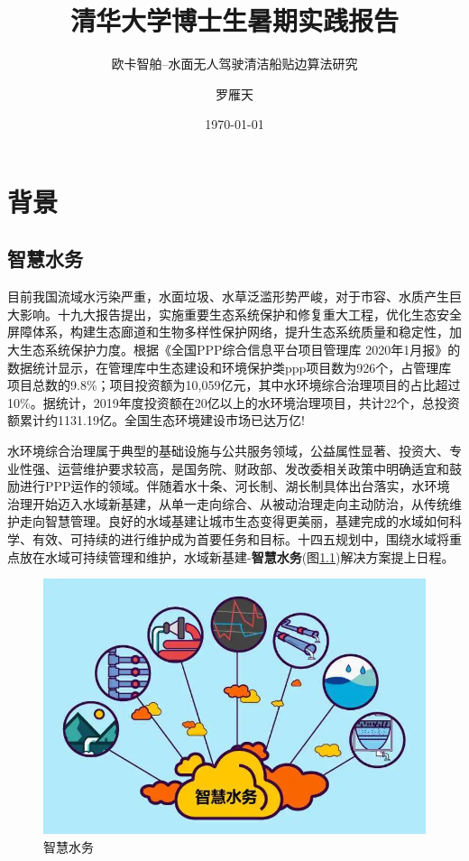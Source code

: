 \documentclass[cn,12pt,color=mine,scheme=chinese,bibstyle=gb7714-2015]{elegantbook}
\title{清华大学博士生暑期实践报告}
\subtitle{欧卡智舶--水面无人驾驶清洁船贴边算法研究}
\author{罗雁天}
\institute{清华大学电子工程系}
\date{\today}
\begin{document}
\maketitle
	
\tableofcontents

\mainmatter

\chapter{背景}
\section{智慧水务}
目前我国流域水污染严重，水面垃圾、水草泛滥形势严峻，对于市容、水质产生巨大影响。十九大报告提出，实施重要生态系统保护和修复重大工程，优化生态安全屏障体系，构建生态廊道和生物多样性保护网络，提升生态系统质量和稳定性，加大生态系统保护力度。根据《全国PPP综合信息平台项目管理库 2020年1月报》的数据统计显示，在管理库中生态建设和环境保护类ppp项目数为926个，占管理库项目总数的9.8\%；项目投资额为10,059亿元，其中水环境综合治理项目的占比超过10\%。据统计，2019年度投资额在20亿以上的水环境治理项目，共计22个，总投资额累计约1131.19亿。全国生态环境建设市场已达万亿!

水环境综合治理属于典型的基础设施与公共服务领域，公益属性显著、投资大、专业性强、运营维护要求较高，是国务院、财政部、发改委相关政策中明确适宜和鼓励进行PPP运作的领域。伴随着水十条、河长制、湖长制具体出台落实，水环境治理开始迈入水域新基建，从单一走向综合、从被动治理走向主动防治，从传统维护走向智慧管理。良好的水域基建让城市生态变得更美丽，基建完成的水域如何科学、有效、可持续的进行维护成为首要任务和目标。十四五规划中，围绕水域将重点放在水域可持续管理和维护，水域新基建-\textbf{智慧水务}(图\ref{bg1})解决方案提上日程。

\begin{figure}[h]
	\centering
	\includegraphics[width=.9\linewidth]{images/bg}
	\caption{\label{bg1}智慧水务}
\end{figure}
\end{document}
